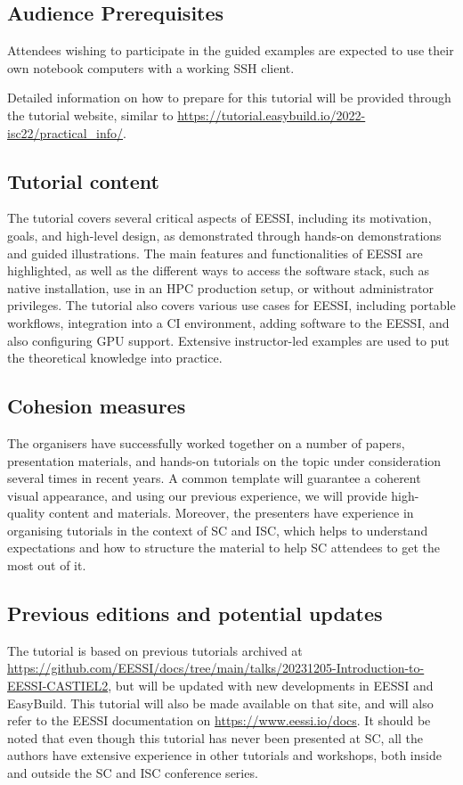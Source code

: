 \subsection*{Audience Prerequisites}
Attendees wishing to participate in the guided examples are expected to use their
own notebook computers with a working SSH client.

Detailed information on how to prepare for this tutorial will be provided
through the tutorial website, similar to
\url{https://tutorial.easybuild.io/2022-isc22/practical_info/}.

\subsection*{Tutorial content}
The tutorial covers several critical aspects of EESSI, including its motivation, goals, and high-level design, as
demonstrated through hands-on demonstrations and guided illustrations. The main features and functionalities of EESSI
are highlighted, as well as the different ways to access the software stack, such as native installation, use in an HPC
production setup, or without administrator privileges. The tutorial also covers various use cases for EESSI, including
portable workflows, integration into a CI environment, adding software to the EESSI, and also configuring GPU support.
Extensive instructor-led examples are used to put the theoretical knowledge into practice.

\subsection*{Cohesion measures}
The organisers have successfully worked together on a number of papers, presentation materials,
and hands-on tutorials on the topic under consideration several times in recent years.
A common template
will guarantee
a coherent visual appearance, and using our previous experience, we will provide high-quality content and materials.
Moreover, the presenters have experience in organising tutorials in the context of SC and ISC, which helps to understand
expectations
and how to structure the material
to help SC attendees to get the most out of it.

\subsection*{Previous editions and potential updates}
The tutorial is based on previous tutorials archived at
\url{https://github.com/EESSI/docs/tree/main/talks/20231205-Introduction-to-EESSI-CASTIEL2},
but will be updated with new developments in EESSI and EasyBuild.
This tutorial will also be made available on that site, and will also refer to the EESSI documentation on
\url{https://www.eessi.io/docs}.
It should be noted that even though this tutorial has never been presented at SC, all the authors have extensive
experience in other tutorials and workshops, both inside and outside the SC and ISC conference series.